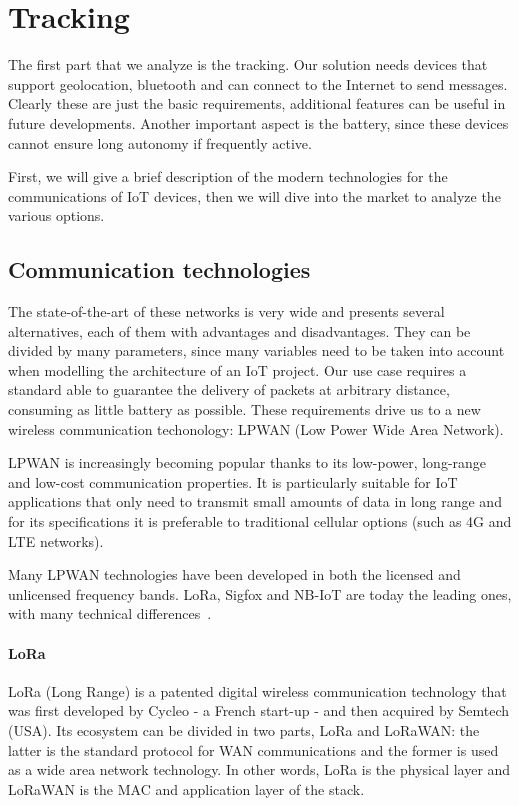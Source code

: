 \chapter{Tracking}
\label{sec:tracking}

The first part that we analyze is the tracking. Our solution needs devices that support geolocation, bluetooth and can connect to the Internet to send messages. Clearly these are just the basic requirements, additional features can be useful in future developments. Another important aspect is the battery, since these devices cannot ensure long autonomy if frequently active. 

First, we will give a brief description of the modern technologies for the communications of IoT devices, then we will dive into the market to analyze the various options.

\section{Communication technologies}
\label{sec:track_comm}

The state-of-the-art of these networks is very wide and presents several alternatives, each of them with advantages and disadvantages. They can be divided by many parameters, since many variables need to be taken into account when modelling the architecture of an IoT project. Our use case requires a standard able to guarantee the delivery of packets at arbitrary distance, consuming as little battery as possible. These requirements drive us to a new wireless communication techonology: LPWAN (Low Power Wide Area Network).

LPWAN is increasingly becoming popular thanks to its low-power, long-range and low-cost communication properties. It is particularly suitable for IoT applications that only need to transmit small amounts of data in long range and for its specifications it is preferable to traditional cellular options (such as 4G and LTE networks).

Many LPWAN technologies have been developed in both the licensed and unlicensed frequency bands. LoRa, Sigfox and NB-IoT are today the leading ones, with many technical differences~\cite{LPWAN_study}.

\subsubsection{LoRa}
LoRa (Long Range) is a patented digital wireless communication technology that was first developed by Cycleo - a French start-up - and then acquired by Semtech (USA). Its ecosystem can be divided in two parts, LoRa and LoRaWAN: the latter is the standard protocol for WAN communications and the former is used as a wide area network technology. In other words, LoRa is the physical layer and LoRaWAN is the MAC and application layer of the stack.

